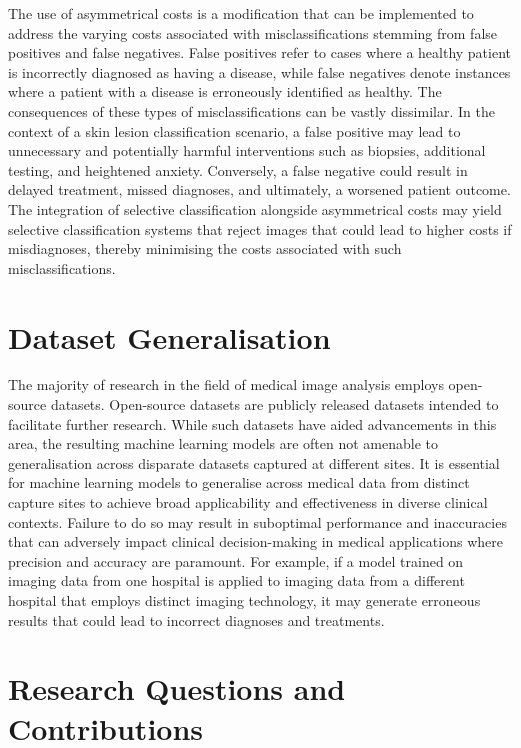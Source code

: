 The use of asymmetrical costs is a modification that can be implemented to address the varying costs associated with misclassifications stemming from false positives and false negatives. False positives refer to cases where a healthy patient is incorrectly diagnosed as having a disease, while false negatives denote instances where a patient with a disease is erroneously identified as healthy. The consequences of these types of misclassifications can be vastly dissimilar. In the context of a skin lesion classification scenario, a false positive may lead to unnecessary and potentially harmful interventions such as biopsies, additional testing, and heightened anxiety. Conversely, a false negative could result in delayed treatment, missed diagnoses, and ultimately, a worsened patient outcome. The integration of selective classification alongside asymmetrical costs may yield selective classification systems that reject images that could lead to higher costs if misdiagnoses, thereby minimising the costs associated with such misclassifications.



\section{Dataset Generalisation}
The majority of research in the field of medical image analysis employs open-source datasets. Open-source datasets are publicly released datasets intended to facilitate further research. While such datasets have aided advancements in this area, the resulting machine learning models are often not amenable to generalisation across disparate datasets captured at different sites. It is essential for machine learning models to generalise across medical data from distinct capture sites to achieve broad applicability and effectiveness in diverse clinical contexts. Failure to do so may result in suboptimal performance and inaccuracies that can adversely impact clinical decision-making in medical applications where precision and accuracy are paramount. For example, if a model trained on imaging data from one hospital is applied to imaging data from a different hospital that employs distinct imaging technology, it may generate erroneous results that could lead to incorrect diagnoses and treatments.



\section{Research Questions and Contributions}
\label{sec:research_contributions}

